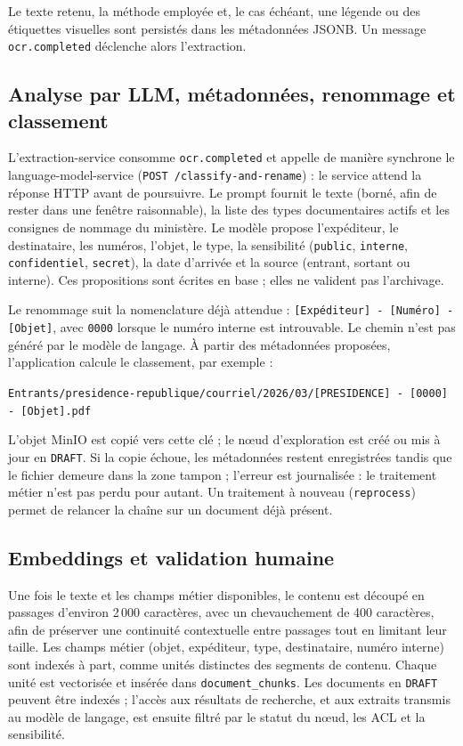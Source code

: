 Le texte retenu, la méthode employée et, le cas échéant, une légende ou des étiquettes visuelles sont persistés dans les métadonnées JSONB. Un message \texttt{ocr.completed} déclenche alors l'extraction.

\subsection{Analyse par LLM, métadonnées, renommage et classement}

L'extraction-service consomme \texttt{ocr.completed} et appelle de manière synchrone le language-model-service (\texttt{POST /classify-and-rename}) : le service attend la réponse HTTP avant de poursuivre. Le prompt fournit le texte (borné, afin de rester dans une fenêtre raisonnable), la liste des types documentaires actifs et les consignes de nommage du ministère. Le modèle propose l'expéditeur, le destinataire, les numéros, l'objet, le type, la sensibilité (\texttt{public}, \texttt{interne}, \texttt{confidentiel}, \texttt{secret}), la date d'arrivée et la source (entrant, sortant ou interne). Ces propositions sont écrites en base ; elles ne valident pas l'archivage.

Le renommage suit la nomenclature déjà attendue : \texttt{[Expéditeur] - [Numéro] - [Objet]}, avec \texttt{0000} lorsque le numéro interne est introuvable. Le chemin n'est pas généré par le modèle de langage. À partir des métadonnées proposées, l'application calcule le classement, par exemple :

\begin{center}
\texttt{Entrants/presidence-republique/courriel/2026/03/[PRESIDENCE] - [0000] - [Objet].pdf}
\end{center}

L'objet MinIO est copié vers cette clé ; le nœud d'exploration est créé ou mis à jour en \texttt{DRAFT}. Si la copie échoue, les métadonnées restent enregistrées tandis que le fichier demeure dans la zone tampon ; l'erreur est journalisée : le traitement métier n'est pas perdu pour autant. Un traitement à nouveau (\texttt{reprocess}) permet de relancer la chaîne sur un document déjà présent.

\subsection{Embeddings et validation humaine}

Une fois le texte et les champs métier disponibles, le contenu est découpé en passages d'environ 2\,000 caractères, avec un chevauchement de 400 caractères, afin de préserver une continuité contextuelle entre passages tout en limitant leur taille. Les champs métier (objet, expéditeur, type, destinataire, numéro interne) sont indexés à part, comme unités distinctes des segments de contenu. Chaque unité est vectorisée et insérée dans \texttt{document\_chunks}. Les documents en \texttt{DRAFT} peuvent être indexés ; l'accès aux résultats de recherche, et aux extraits transmis au modèle de langage, est ensuite filtré par le statut du nœud, les ACL et la sensibilité.

